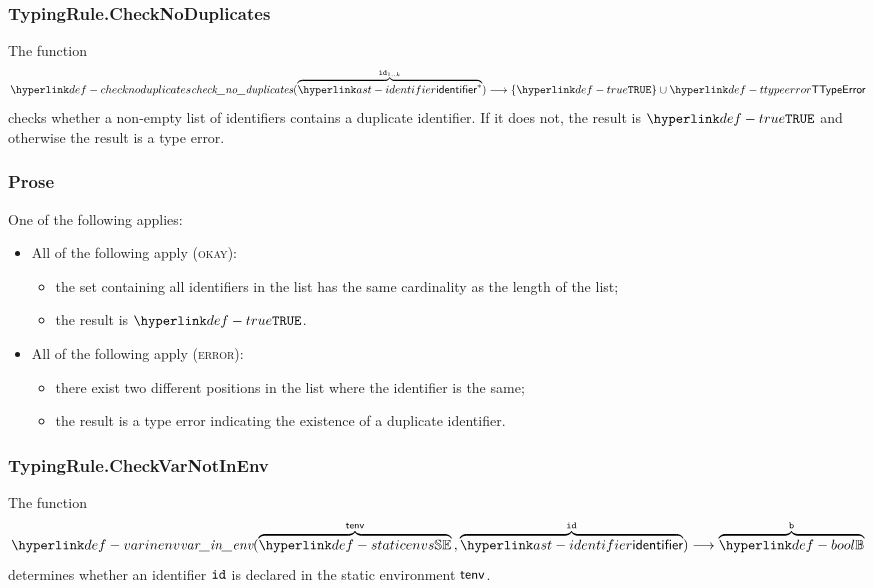 \subsubsection{TypingRule.CheckNoDuplicates \label{sec:TypingRule.CheckNoDuplicates}}
The function
\[
  \checknoduplicates(\overname{\identifier^*}{\id_{1..k}}) \aslto \{\True\} \cup \TTypeError
\]
checks whether a non-empty list of identifiers contains a duplicate identifier. If it does not, the result
is $\True$ and otherwise the result is a type error.

\subsubsection{Prose}
One of the following applies:
\begin{itemize}
  \item All of the following apply (\textsc{okay}):
  \begin{itemize}
    \item the set containing all identifiers in the list has the same cardinality as the length of the list;
    \item the result is $\True$.
  \end{itemize}

  \item All of the following apply (\textsc{error}):
  \begin{itemize}
    \item there exist two different positions in the list where the identifier is the same;
    \item the result is a type error indicating the existence of a duplicate identifier.
  \end{itemize}
\end{itemize}


\hypertarget{def-checkvarnotinenv}{}
\hypertarget{def-varinenv}{}
\subsubsection{TypingRule.CheckVarNotInEnv}
The function
\[
  \varinenv{\overname{\staticenvs}{\tenv} \aslsep \overname{\identifier}{\id}}
  \aslto \overname{\Bool}{\vb}
\]
determines whether an identifier $\texttt{id}$ is declared in the static environment $\textsf{tenv}$.

